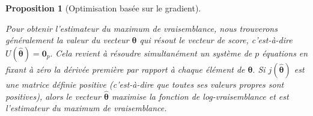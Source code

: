 \documentclass[
  11pt,
  letterpaper,
]{scrbook}
\theoremstyle{plain}
\newtheorem{proposition}{Proposition}[chapter]
\theoremstyle{plain}
\theoremstyle{definition}
\theoremstyle{definition}
\theoremstyle{remark}
\begin{document}
\begin{proposition}[Optimisation basée sur le
gradient]\protect\hypertarget{prp-gradient}{}\label{prp-gradient}

Pour obtenir l'estimateur du maximum de vraisemblance, nous trouverons
généralement la valeur du vecteur \(\boldsymbol{\theta}\) qui résout le
vecteur de score, c'est-à-dire
\(U(\widehat{\boldsymbol{\theta}})=\boldsymbol{0}_p.\) Cela revient à
résoudre simultanément un système de \(p\) équations en fixant à zéro la
dérivée première par rapport à chaque élément de
\(\boldsymbol{\theta}.\) Si \(j(\widehat{\boldsymbol{\theta}})\) est une
matrice définie positive (c'est-à-dire que toutes ses valeurs propres
sont positives), alors le vecteur \(\widehat{\boldsymbol{\theta}}\)
maximise la fonction de log-vraisemblance et est l'estimateur du maximum
de vraisemblance.


\end{proposition}
\end{document}
